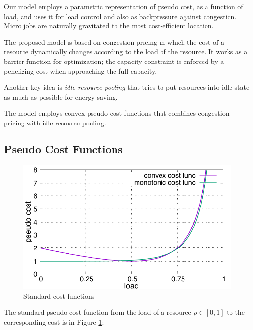 

Our model employs a parametric representation of pseudo cost, as a
function of load, and uses it for load control and also as
backpressure against congestion.
Micro jobs are naturally gravitated to the most cost-efficient
location.

The proposed model is based on congestion pricing in which the cost of
a resource dynamically changes according to the load of the resource.
It works as a barrier function for optimization; the capacity
constraint is enforced by a penelizing cost when approaching the full
capacity.

Another key idea is {\em idle resource pooling} that tries to put resources
into idle state as much as possible for energy saving.

The model employs convex pseudo cost functions that combines congestion
pricing with idle resource pooling.

\subsection{Pseudo Cost Functions}

\begin{figure}[tb]
  \begin{center}
    \includegraphics[width=1.0\columnwidth]{costfunc.pdf}
    \vspace{-2.0ex}
    \caption{Standard cost functions}
    \label{fig:std_costfunc}
  \end{center}
\end{figure}

The standard pseudo cost function from the load of a resource
$\rho \in [0, 1]$ to the corresponding cost is in Figure
\ref{fig:std_costfunc}: \\

